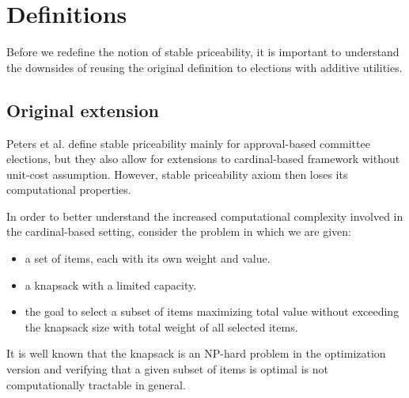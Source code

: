 \section{Definitions}
Before we redefine the notion of stable priceability, it is important to understand the downsides of reusing the original definition to elections with additive utilities.
\subsection{Original extension}
Peters et al.\cite{MarketBased} define stable priceability mainly for approval-based committee elections, but they also allow for extensions to cardinal-based framework without unit-cost assumption. However, stable priceability axiom then loses its computational properties.

In order to better understand the increased computational complexity involved in the cardinal-based setting, consider the problem in which we are given:
\begin{itemize}
    \item a set of items, each with its own weight and value.
    \item a knapsack with a limited capacity.
    \item the goal to select a subset of items maximizing total value without exceeding the knapsack size with total weight of all selected items.
\end{itemize}
It is well known that the knapsack is an NP-hard problem in the optimization version \cite{GareyJohnson} and verifying that a given subset of items is optimal is not computationally tractable in general.


